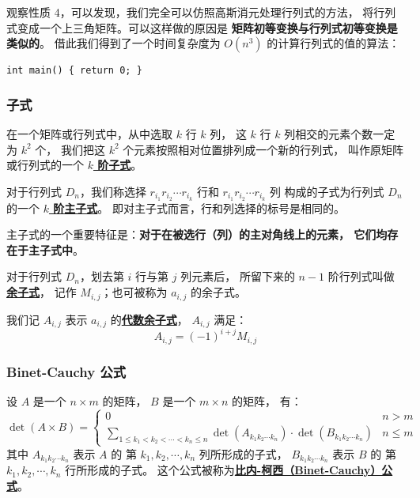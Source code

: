\documentclass[UTF8]{article}
\begin{document}
	\bigskip


	观察性质 4，可以发现，我们完全可以仿照高斯消元处理行列式的方法，
	将行列式变成一个上三角矩阵。可以这样做的原因是
	\textbf{矩阵初等变换与行列式初等变换是类似的}。
	借此我们得到了一个时间复杂度为 $O(n^3)$ 的计算行列式的值的算法：

	\lstset{language=C++}
	\begin{lstlisting}
int main() { return 0; }
	\end{lstlisting}

	\subsubsection{子式}

	在一个矩阵或行列式中，从中选取 $k$ 行 $k$ 列，
	这 $k$ 行 $k$ 列相交的元素个数一定为 $k^2$ 个，
	我们把这 $k^2$ 个元素按照相对位置排列成一个新的行列式，
	叫作原矩阵或行列式的一个 \textbf{\uline{$k$ 阶子式}}。

	\bigskip


	对于行列式 $D_n$，我们称选择
	$r_{i_1} r_{i_2} \cdots r_{i_k}$ 行和
	$r_{i_1} r_{i_2} \cdots r_{i_k}$ 列
	构成的子式为行列式 $D_n$ 的一个 \textbf{\uline{$k$ 阶主子式}}。
	即对主子式而言，行和列选择的标号是相同的。

	主子式的一个重要特征是：\textbf{对于在被选行（列）的主对角线上的元素，
	它们均存在于主子式中}。

	\bigskip


	对于行列式 $D_n$，划去第 $i$ 行与第 $j$ 列元素后，
	所留下来的 $n - 1$ 阶行列式叫做\textbf{\uline{余子式}}，
	记作 $M_{i, j}$；也可被称为 $a_{i, j}$ 的余子式。

	\bigskip


	我们记 $A_{i, j}$ 表示 $a_{i, j}$ 的\textbf{\uline{代数余子式}}，
	$A_{i, j}$ 满足：
	$$
	A_{i, j} = (-1)^{i + j}M_{i, j}
	$$

	\subsubsection{Binet-Cauchy 公式}

	设 $A$ 是一个 $n \times m$ 的矩阵，
	$B$ 是一个 $m \times n$ 的矩阵，
	有：
	\begin{equation*}
		\det(A \times B) =
		\begin{cases}
			0 & n > m
			\\
			\sum_{1 \le k_1 < k_2 < \cdots < k_n \le n}
			\det(A_{k_1 k_2 \cdots k_n}) \cdot
			\det(B_{k_1 k_2 \cdots k_n})
			& n \le m
		\end{cases}
	\end{equation*}
	其中 $A_{k_1 k_2 \cdots k_n}$ 表示 $A$ 的
	第 $k_1, k_2, \cdots, k_n$ 列所形成的子式，
	$B_{k_1 k_2 \cdots k_n}$ 表示 $B$ 的
	第 $k_1, k_2, \cdots, k_n$ 行所形成的子式。
	这个公式被称为\textbf{\uline{比内-柯西（Binet-Cauchy）公式}}。
\end{document}
